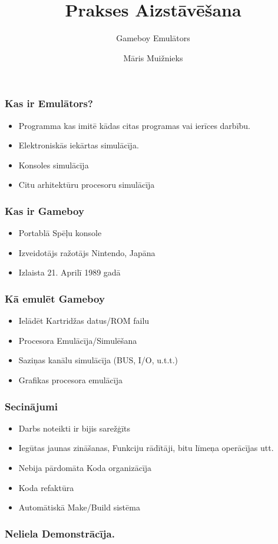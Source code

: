 \documentclass{beamer}
\title{Prakses Aizstāvēšana}
\subtitle{Gameboy Emulātors}
\author{Māris Muižnieks}
\begin{document}
\begin{frame}
	\maketitle
\end{frame}
\begin{frame}
\frametitle{Kas ir Emulātors?}
	\begin{itemize}
		\item Programma kas imitē kādas citas programas vai ierīces darbību.
		\item Elektroniskās iekārtas simulācīja.
		\item Konsoles simulācīja
		\item Citu arhitektūru procesoru simulācīja
	\end{itemize}
\end{frame}
\begin{frame}
	\frametitle{Kas ir Gameboy}
	\begin{itemize}
		\item Portablā Spēļu konsole 
		\item Izveidotājs ražotājs Nintendo, Japāna
		\item Izlaista 21. Aprilī 1989 gadā
	\end{itemize}
\end{frame}
\begin{frame}
	\frametitle{Kā emulēt Gameboy}
	\begin{itemize}
		\item Ielādēt Kartridžas datus/ROM failu
		\item Procesora Emulācīja/Simulēšana
		\item Saziņas kanālu simulācīja (BUS, I/O, u.t.t.)
		\item Grafikas procesora emulācīja
	\end{itemize}
\end{frame}
\begin{frame}
	\frametitle{Secinājumi}
	\begin{itemize}
		\item Darbs noteikti ir bijis sarežģīts
		\item Iegūtas jaunas zināšanas, Funkciju rādītāji, bitu līmeņa operācījas utt.
		\item Nebija pārdomāta Koda organizācīja
		\item Koda refaktūra
		\item Automātiskā Make/Build sistēma
	\end{itemize}
\end{frame}
\begin{frame}
	\frametitle{Neliela Demonstrācīja.}
\end{frame}
\end{document}
